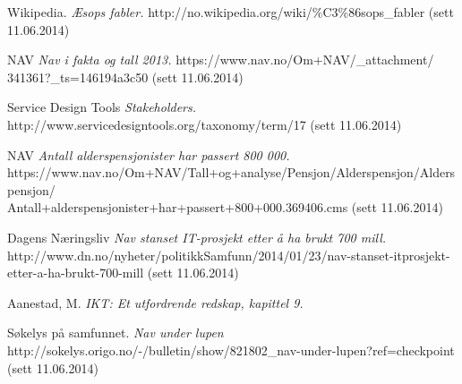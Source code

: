 \documentclass[informationsecurity]{gucmasterproject}
\begin{document}
\begin{thebibliography}{9}

	Wikipedia.
	\emph{Æsops fabler.}
	http://no.wikipedia.org/wiki/\%C3\%86sops\_fabler
	(sett 11.06.2014)

	NAV
	\emph{Nav i fakta og tall 2013.}
	https://www.nav.no/Om+NAV/\_attachment/\\341361?\_ts=146194a3c50
	(sett 11.06.2014)

	Service Design Tools
	\emph{Stakeholders.}
	http://www.servicedesigntools.org/taxonomy/term/17
	(sett 11.06.2014)

	NAV
	\emph{Antall alderspensjonister har passert 800 000.}\\
	https://www.nav.no/Om+NAV/Tall+og+analyse/Pensjon/Alderspensjon/Alderspensjon/\\Antall+alderspensjonister+har+passert+800+000.369406.cms
	(sett 11.06.2014)

	Dagens Næringsliv
	\emph{Nav stanset IT-prosjekt etter å ha brukt 700 mill.}
	http://www.dn.no/nyheter/politikkSamfunn/2014/01/23/nav-stanset-itprosjekt-etter-a-ha-brukt-700-mill
	(sett 11.06.2014)

	Aanestad, M.
	\emph{IKT: Et utfordrende redskap, kapittel 9.}

	Søkelys på samfunnet.
	\emph{Nav under lupen}
	http://sokelys.origo.no/-/bulletin/show/821802\_nav-under-lupen?ref=checkpoint
	(sett 11.06.2014)

\end{thebibliography}
\end{document}
